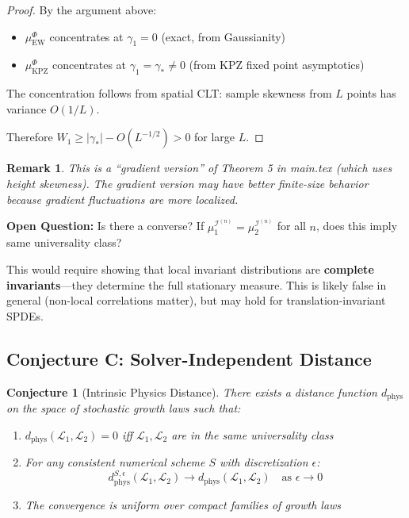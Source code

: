 \documentclass[11pt]{article}
\newtheorem{conjecture}{Conjecture}[section]
\newtheorem{remark}{Remark}[section]
\begin{document}
\begin{proof}
By the argument above:
\begin{itemize}
\item $\mu_{\text{EW}}^\Phi$ concentrates at $\gamma_1 = 0$ (exact, from Gaussianity)
\item $\mu_{\text{KPZ}}^\Phi$ concentrates at $\gamma_1 = \gamma_* \neq 0$ (from KPZ fixed point asymptotics)
\end{itemize}

The concentration follows from spatial CLT: sample skewness from $L$ points has variance $O(1/L)$.

Therefore $W_1 \geq |\gamma_*| - O(L^{-1/2}) > 0$ for large $L$.
\end{proof}

\begin{remark}
This is a ``gradient version'' of Theorem 5 in main.tex (which uses height skewness). The gradient version may have better finite-size behavior because gradient fluctuations are more localized.
\end{remark}

\textbf{Open Question:} Is there a converse? If $\mu_1^{\mathcal{I}^{(n)}} = \mu_2^{\mathcal{I}^{(n)}}$ for all $n$, does this imply same universality class? 

This would require showing that local invariant distributions are \textbf{complete invariants}---they determine the full stationary measure. This is likely false in general (non-local correlations matter), but may hold for translation-invariant SPDEs.

\subsection{Conjecture C: Solver-Independent Distance}

\begin{conjecture}[Intrinsic Physics Distance]
\label{conj:solver-independent}
There exists a distance function $d_{\text{phys}}$ on the space of stochastic growth laws such that:
\begin{enumerate}
\item $d_{\text{phys}}(\mathcal{L}_1, \mathcal{L}_2) = 0$ iff $\mathcal{L}_1, \mathcal{L}_2$ are in the same universality class
\item For any consistent numerical scheme $S$ with discretization $\epsilon$:
\[
d_{\text{phys}}^{S,\epsilon}(\mathcal{L}_1, \mathcal{L}_2) \to d_{\text{phys}}(\mathcal{L}_1, \mathcal{L}_2) \quad \text{as } \epsilon \to 0
\]
\item The convergence is uniform over compact families of growth laws
\end{enumerate}
\end{conjecture}
\end{document}
